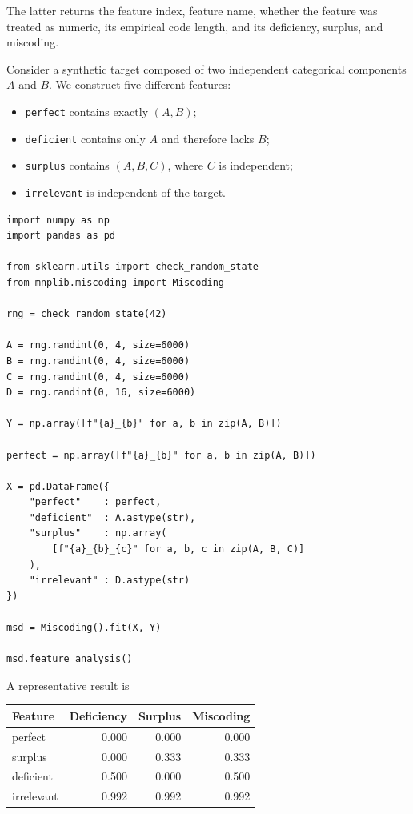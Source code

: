 The latter returns the feature index, feature name, whether the feature was treated as numeric, its empirical code length, and its deficiency, surplus, and miscoding.

\begin{example}
\label{example:miscoding_synthetic}

Consider a synthetic target composed of two independent categorical components $A$ and $B$. We construct five different features:

\begin{itemize}
    \item \texttt{perfect} contains exactly $(A,B)$;
    \item \texttt{deficient} contains only $A$ and therefore lacks $B$;
    \item \texttt{surplus} contains $(A,B,C)$, where $C$ is independent;
    \item \texttt{irrelevant} is independent of the target.
\end{itemize}

\begin{sourcecode}
{\scriptsize \begin{verbatim}
import numpy as np
import pandas as pd

from sklearn.utils import check_random_state
from mnplib.miscoding import Miscoding

rng = check_random_state(42)

A = rng.randint(0, 4, size=6000)
B = rng.randint(0, 4, size=6000)
C = rng.randint(0, 4, size=6000)
D = rng.randint(0, 16, size=6000)

Y = np.array([f"{a}_{b}" for a, b in zip(A, B)])

perfect = np.array([f"{a}_{b}" for a, b in zip(A, B)])

X = pd.DataFrame({
    "perfect"    : perfect,
    "deficient"  : A.astype(str),
    "surplus"    : np.array(
        [f"{a}_{b}_{c}" for a, b, c in zip(A, B, C)]
    ),
    "irrelevant" : D.astype(str)
})

msd = Miscoding().fit(X, Y)

msd.feature_analysis()
\end{verbatim}}
\end{sourcecode}

A representative result is

\begin{center}
\begin{tabular}{lrrr}
\hline
Feature & Deficiency & Surplus & Miscoding \\
\hline
perfect    & 0.000 & 0.000 & 0.000 \\
surplus    & 0.000 & 0.333 & 0.333 \\
deficient  & 0.500 & 0.000 & 0.500 \\
irrelevant & 0.992 & 0.992 & 0.992 \\
\hline
\end{tabular}
\end{center}


\end{example}
